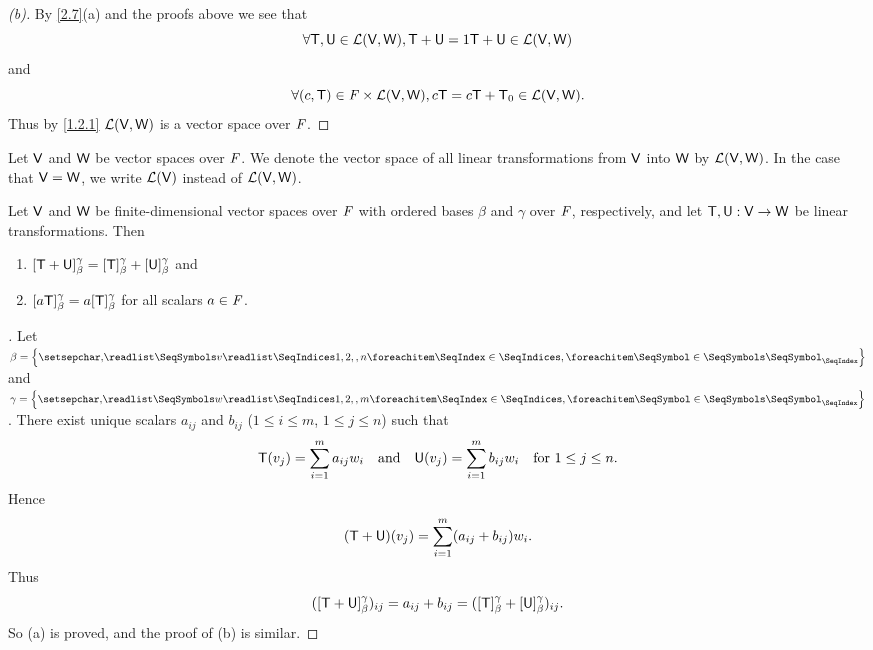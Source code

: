 \begin{proof}[(b)]
  By \cref{2.7}(a) and the proofs above we see that
  \[
    \forall \mathsf{T}, \mathsf{U} \in \mathcal{L}(\mathsf{V}, \mathsf{W}), \mathsf{T} + \mathsf{U} = 1 \mathsf{T} + \mathsf{U} \in \mathcal{L}(\mathsf{V}, \mathsf{W})
  \]
  and
  \[
    \forall (c, \mathsf{T}) \in \mathit{F} \times \mathcal{L}(\mathsf{V}, \mathsf{W}), c \mathsf{T} = c \mathsf{T} + \mathsf{T}_0 \in \mathcal{L}(\mathsf{V}, \mathsf{W}).
  \]
  Thus by \cref{1.2.1} \(\mathcal{L}(\mathsf{V}, \mathsf{W})\) is a vector space over \(\mathit{F}\).
\end{proof}

\begin{defn}\label{2.2.6}
  Let \(\mathsf{V}\) and \(\mathsf{W}\) be vector spaces over \(\mathit{F}\).
  We denote the vector space of all linear transformations from \(\mathsf{V}\) into \(\mathsf{W}\) by \(\mathcal{L}(\mathsf{V}, \mathsf{W})\).
  In the case that \(\mathsf{V} = \mathsf{W}\), we write \(\mathcal{L}(\mathsf{V})\) instead of \(\mathcal{L}(\mathsf{V}, \mathsf{W})\).
\end{defn}

\begin{thm}\label{2.8}
  Let \(\mathsf{V}\) and \(\mathsf{W}\) be finite-dimensional vector spaces over \(\mathit{F}\) with ordered bases \(\beta\) and \(\gamma\) over \(\mathit{F}\), respectively, and let \(\mathsf{T}, \mathsf{U} : \mathsf{V} \to \mathsf{W}\) be linear transformations.
  Then
  \begin{enumerate}
    \item \([\mathsf{T} + \mathsf{U}]_{\beta}^{\gamma} = [\mathsf{T}]_{\beta}^{\gamma} + [\mathsf{U}]_{\beta}^{\gamma}\) and
    \item \([a \mathsf{T}]_{\beta}^{\gamma} = a [\mathsf{T}]_{\beta}^{\gamma}\) for all scalars \(a \in \mathit{F}\).
  \end{enumerate}
\end{thm}

\begin{proof}[]
  Let \(\beta = \set{\seq{v}{1,2,,n}}\) and \(\gamma = \set{\seq{w}{1,2,,m}}\).
  There exist unique scalars \(a_{i j}\) and \(b_{i j}\) (\(1 \leq i \leq m\), \(1 \leq j \leq n\)) such that
  \[
    \mathsf{T}(v_j) = \sum_{i = 1}^m a_{i j} w_i \quad \text{and} \quad \mathsf{U}(v_j) = \sum_{i = 1}^m b_{i j} w_i \quad \text{for } 1 \leq j \leq n.
  \]
  Hence
  \[
    (\mathsf{T} + \mathsf{U})(v_j) = \sum_{i = 1}^m (a_{i j} + b_{i j}) w_i.
  \]
  Thus
  \[
    ([\mathsf{T} + \mathsf{U}]_{\beta}^{\gamma})_{i j} = a_{i j} + b_{i j} = ([\mathsf{T}]_{\beta}^{\gamma} + [\mathsf{U}]_{\beta}^{\gamma})_{i j}.
  \]
  So (a) is proved, and the proof of (b) is similar.
\end{proof}
